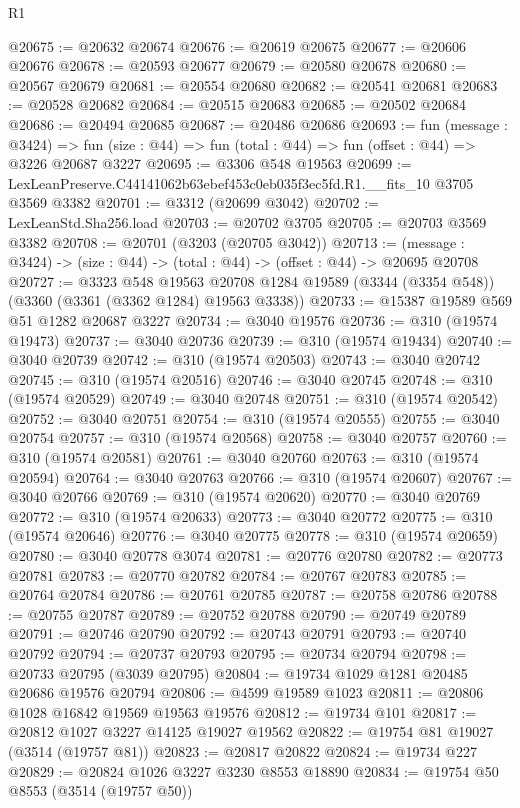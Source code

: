 \begin{lexlean}{R1}
\begin{coremodule}
@20675 := @20632 @20674
@20676 := @20619 @20675
@20677 := @20606 @20676
@20678 := @20593 @20677
@20679 := @20580 @20678
@20680 := @20567 @20679
@20681 := @20554 @20680
@20682 := @20541 @20681
@20683 := @20528 @20682
@20684 := @20515 @20683
@20685 := @20502 @20684
@20686 := @20494 @20685
@20687 := @20486 @20686
@20693 := fun (message : @3424) =>
  fun (size : @44) => fun (total : @44) => fun (offset : @44) => @3226 @20687 @3227
@20695 := @3306 @548 @19563
@20699 := LexLeanPreserve.C44141062b63ebef453c0eb035f3ec5fd.R1.__fits_10 @3705 @3569 @3382
@20701 := @3312 (@20699 @3042)
@20702 := LexLeanStd.Sha256.load
@20703 := @20702 @3705
@20705 := @20703 @3569 @3382
@20708 := @20701 (@3203 (@20705 @3042))
@20713 := (message : @3424) -> (size : @44) -> (total : @44) -> (offset : @44) -> @20695 @20708
@20727 := @3323
    @548
    @19563
    @20708
    @1284
    @19589
    (@3344 (@3354 @548))
    (@3360 (@3361 (@3362 @1284) @19563 @3338))
@20733 := @15387 @19589 @569 @51 @1282 @20687 @3227
@20734 := @3040 @19576
@20736 := @310 (@19574 @19473)
@20737 := @3040 @20736
@20739 := @310 (@19574 @19434)
@20740 := @3040 @20739
@20742 := @310 (@19574 @20503)
@20743 := @3040 @20742
@20745 := @310 (@19574 @20516)
@20746 := @3040 @20745
@20748 := @310 (@19574 @20529)
@20749 := @3040 @20748
@20751 := @310 (@19574 @20542)
@20752 := @3040 @20751
@20754 := @310 (@19574 @20555)
@20755 := @3040 @20754
@20757 := @310 (@19574 @20568)
@20758 := @3040 @20757
@20760 := @310 (@19574 @20581)
@20761 := @3040 @20760
@20763 := @310 (@19574 @20594)
@20764 := @3040 @20763
@20766 := @310 (@19574 @20607)
@20767 := @3040 @20766
@20769 := @310 (@19574 @20620)
@20770 := @3040 @20769
@20772 := @310 (@19574 @20633)
@20773 := @3040 @20772
@20775 := @310 (@19574 @20646)
@20776 := @3040 @20775
@20778 := @310 (@19574 @20659)
@20780 := @3040 @20778 @3074
@20781 := @20776 @20780
@20782 := @20773 @20781
@20783 := @20770 @20782
@20784 := @20767 @20783
@20785 := @20764 @20784
@20786 := @20761 @20785
@20787 := @20758 @20786
@20788 := @20755 @20787
@20789 := @20752 @20788
@20790 := @20749 @20789
@20791 := @20746 @20790
@20792 := @20743 @20791
@20793 := @20740 @20792
@20794 := @20737 @20793
@20795 := @20734 @20794
@20798 := @20733 @20795 (@3039 @20795)
@20804 := @19734 @1029 @1281 @20485 @20686 @19576 @20794
@20806 := @4599 @19589 @1023
@20811 := @20806 @1028 @16842 @19569 @19563 @19576
@20812 := @19734 @101
@20817 := @20812 @1027 @3227 @14125 @19027 @19562
@20822 := @19754 @81 @19027 (@3514 (@19757 @81))
@20823 := @20817 @20822
@20824 := @19734 @227
@20829 := @20824 @1026 @3227 @3230 @8553 @18890
@20834 := @19754 @50 @8553 (@3514 (@19757 @50))

\end{coremodule}
\end{lexlean}
